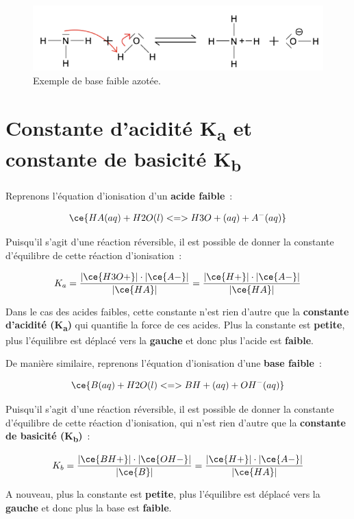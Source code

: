 \documentclass[
  11pt,
  a4paper,
  openany]{book}
\begin{document}
\begin{figure}

{\centering \includegraphics[width=0.5\linewidth]{images/acides-bases-3} 

}

\caption{Exemple de base faible azotée.}\label{fig:acides-bases-3}
\end{figure}

\hypertarget{constante-dacidituxe9-ka-et-constante-de-basicituxe9-kb}{%
\section{\texorpdfstring{Constante d'acidité K\textsubscript{a} et constante de basicité K\textsubscript{b}}{Constante d'acidité Ka et constante de basicité Kb}}\label{constante-dacidituxe9-ka-et-constante-de-basicituxe9-kb}}

Reprenons l'équation d'ionisation d'un \textbf{acide faible}~:

\[
\ce{HA(aq) + H2O(l) <=> H3O+(aq) + A^{-}(aq)}
\]

Puisqu'il s'agit d'une réaction réversible, il est possible de donner la constante d'équilibre de cette réaction d'ionisation~:

\[
K_a = \frac{|\ce{H3O+}| \cdot |\ce{A-}|}{|\ce{HA}|} =  \frac{|\ce{H+}| \cdot |\ce{A-}|}{|\ce{HA}|}
\]

Dans le cas des acides faibles, cette constante n'est rien d'autre que la \textbf{constante d'acidité (K\textsubscript{a})} qui quantifie la force de ces acides. Plus la constante est \textbf{petite}, plus l'équilibre est déplacé vers la \textbf{gauche} et donc plus l'acide est \textbf{faible}.

De manière similaire, reprenons l'équation d'ionisation d'une \textbf{base faible}~:

\[
\ce{B(aq) + H2O(l) <=> BH+(aq) + OH^{-}(aq)}
\]

Puisqu'il s'agit d'une réaction réversible, il est possible de donner la constante d'équilibre de cette réaction d'ionisation, qui n'est rien d'autre que la \textbf{constante de basicité (K\textsubscript{b})}~:

\[
K_b = \frac{|\ce{BH+}| \cdot |\ce{OH-}|}{|\ce{B}|} =  \frac{|\ce{H+}| \cdot |\ce{A-}|}{|\ce{HA}|}
\]

A nouveau, plus la constante est \textbf{petite}, plus l'équilibre est déplacé vers la \textbf{gauche} et donc plus la base est \textbf{faible}.
\end{document}
